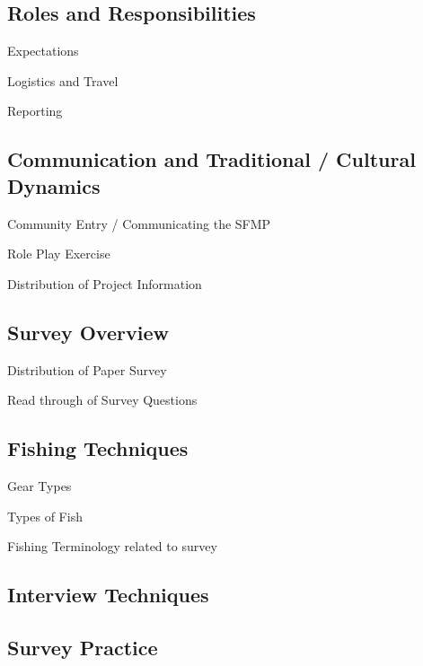 \documentclass[a4paper,agenda,11pt]{meetingmins}
\begin{document}
\subsection{Roles and Responsibilities}
\begin{subitems}
\item Expectations
\item Logistics and Travel
\item Reporting
\end{subitems}

\subsection{Communication and Traditional / Cultural Dynamics}
\begin{subitems}
\item Community Entry / Communicating the SFMP
\item Role Play Exercise
\item Distribution of Project Information
\end{subitems}

\subsection{Survey Overview}
\begin{subitems}
\item Distribution of Paper Survey
\item Read through of Survey Questions
\end{subitems}

\subsection{Fishing Techniques}
\begin{subitems}
\item Gear Types
\item Types of Fish
\item Fishing Terminology related to survey
\end{subitems}

\subsection{Interview Techniques}

\subsection{Survey Practice}
\end{document}
